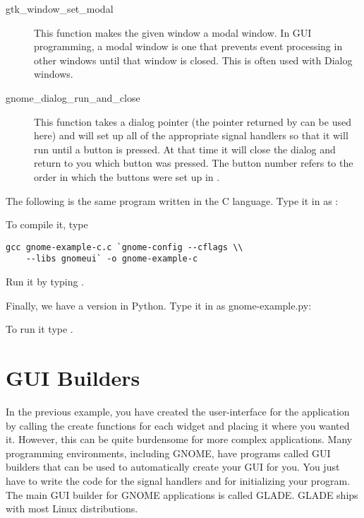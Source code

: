 \begin{description}
\item[gtk\_window\_set\_modal] This function makes the given window a modal window.  In
GUI programming, a modal window is one that prevents event
processing in other windows until that window is closed.
This is often used with Dialog windows.
\item[gnome\_dialog\_run\_and\_close] This function takes a dialog pointer (the pointer returned
by  can be used
here) and will set up all of the appropriate signal handlers
so that it will run until a button is pressed.  At that
time it will close the dialog and return to you which button
was pressed.  The button number refers to the order in which
the buttons were set up in .
\end{description}

The following is the same program written in the C language.
Type it in as :

\begin{simpletyping}

\end{simpletyping}

To compile it, type

\begin{simpletyping}
\begin{lstlisting}
gcc gnome-example-c.c `gnome-config --cflags \\
    --libs gnomeui` -o gnome-example-c
\end{lstlisting}
\end{simpletyping}

Run it by typing .

Finally, we have a version in Python.  Type it in as gnome-example.py:

\begin{simpletyping}

\end{simpletyping}

To run it type .

\section{GUI Builders}

In the previous example, you have created the user-interface
for the application by calling the create functions for each
widget and placing it where you wanted it.  However, this can
be quite burdensome for more complex applications.  Many 
programming environments, including GNOME, have programs
called GUI builders that can be used to automatically create
your GUI for you.  You just have to write the code for the
signal handlers and for initializing your program.  The
main GUI builder for GNOME applications is called GLADE.
GLADE ships with most Linux distributions.

